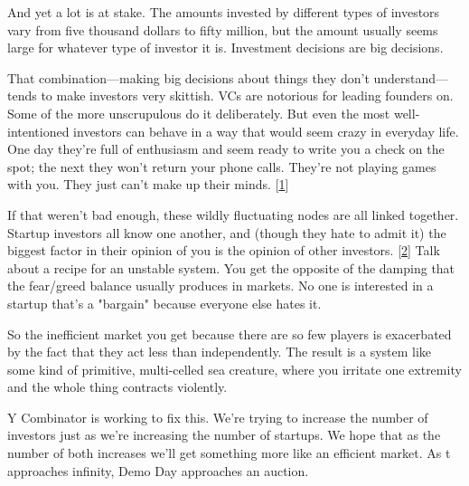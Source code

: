 And
                    yet a lot is at stake. The amounts invested by different
                    types of investors vary from five thousand dollars to fifty
                    million, but the amount usually seems large for whatever
                    type of investor it is. Investment decisions are big
                    decisions.

That combination---making big
                    decisions about things they don't understand---tends to
                    make investors very skittish. VCs are notorious for leading
                    founders on. Some of the more unscrupulous do it
                    deliberately. But even the most well-intentioned investors
                    can behave in a way that would seem crazy in everyday life.
                    One day they're full of enthusiasm and seem ready to write
                    you a check on the spot; the next they won't return your
                    phone calls. They're not playing games with you. They just
                    can't make up their minds.
                    [\href{\#f1n}{1}]

If that weren't bad enough, these wildly
                    fluctuating nodes are all linked together. Startup investors
                    all know one another, and (though they hate to admit it) the
                    biggest factor in their opinion of you is the opinion of
                    other investors.
                    [\href{\#f2n}{2}]
                    Talk about a recipe for an unstable system. You get the
                    opposite of the damping that the fear/greed balance usually
                    produces in markets. No one is interested in a startup
                    that's a "bargain" because everyone else hates it.

So
                    the inefficient market you get because there are so few
                    players is exacerbated by the fact that they act less than
                    independently. The result is a system like some kind of
                    primitive, multi-celled sea creature, where you irritate one
                    extremity and the whole thing contracts violently.

Y
                    Combinator is working to fix this. We're trying to increase
                    the number of investors just as we're increasing the number
                    of startups. We hope that as the number of both increases
                    we'll get something more like an efficient market. As t
                    approaches infinity, Demo Day approaches an auction.

